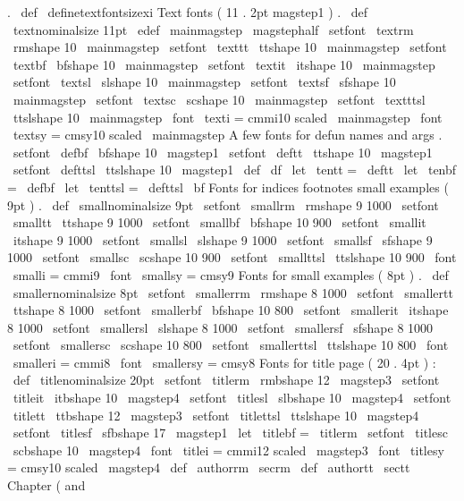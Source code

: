 {.
%
\
def
\
definetextfontsizexi
{
%
Text
fonts
(
11
.
2pt
magstep1
)
.
\
def
\
textnominalsize
{
11pt
}
\
edef
\
mainmagstep
{
\
magstephalf
}
\
setfont
\
textrm
\
rmshape
{
10
}
{
\
mainmagstep
}
\
setfont
\
texttt
\
ttshape
{
10
}
{
\
mainmagstep
}
\
setfont
\
textbf
\
bfshape
{
10
}
{
\
mainmagstep
}
\
setfont
\
textit
\
itshape
{
10
}
{
\
mainmagstep
}
\
setfont
\
textsl
\
slshape
{
10
}
{
\
mainmagstep
}
\
setfont
\
textsf
\
sfshape
{
10
}
{
\
mainmagstep
}
\
setfont
\
textsc
\
scshape
{
10
}
{
\
mainmagstep
}
\
setfont
\
textttsl
\
ttslshape
{
10
}
{
\
mainmagstep
}
\
font
\
texti
=
cmmi10
scaled
\
mainmagstep
\
font
\
textsy
=
cmsy10
scaled
\
mainmagstep
%
A
few
fonts
for
defun
names
and
args
.
\
setfont
\
defbf
\
bfshape
{
10
}
{
\
magstep1
}
\
setfont
\
deftt
\
ttshape
{
10
}
{
\
magstep1
}
\
setfont
\
defttsl
\
ttslshape
{
10
}
{
\
magstep1
}
\
def
\
df
{
\
let
\
tentt
=
\
deftt
\
let
\
tenbf
=
\
defbf
\
let
\
tenttsl
=
\
defttsl
\
bf
}
%
Fonts
for
indices
footnotes
small
examples
(
9pt
)
.
\
def
\
smallnominalsize
{
9pt
}
\
setfont
\
smallrm
\
rmshape
{
9
}
{
1000
}
\
setfont
\
smalltt
\
ttshape
{
9
}
{
1000
}
\
setfont
\
smallbf
\
bfshape
{
10
}
{
900
}
\
setfont
\
smallit
\
itshape
{
9
}
{
1000
}
\
setfont
\
smallsl
\
slshape
{
9
}
{
1000
}
\
setfont
\
smallsf
\
sfshape
{
9
}
{
1000
}
\
setfont
\
smallsc
\
scshape
{
10
}
{
900
}
\
setfont
\
smallttsl
\
ttslshape
{
10
}
{
900
}
\
font
\
smalli
=
cmmi9
\
font
\
smallsy
=
cmsy9
%
Fonts
for
small
examples
(
8pt
)
.
\
def
\
smallernominalsize
{
8pt
}
\
setfont
\
smallerrm
\
rmshape
{
8
}
{
1000
}
\
setfont
\
smallertt
\
ttshape
{
8
}
{
1000
}
\
setfont
\
smallerbf
\
bfshape
{
10
}
{
800
}
\
setfont
\
smallerit
\
itshape
{
8
}
{
1000
}
\
setfont
\
smallersl
\
slshape
{
8
}
{
1000
}
\
setfont
\
smallersf
\
sfshape
{
8
}
{
1000
}
\
setfont
\
smallersc
\
scshape
{
10
}
{
800
}
\
setfont
\
smallerttsl
\
ttslshape
{
10
}
{
800
}
\
font
\
smalleri
=
cmmi8
\
font
\
smallersy
=
cmsy8
%
Fonts
for
title
page
(
20
.
4pt
)
:
\
def
\
titlenominalsize
{
20pt
}
\
setfont
\
titlerm
\
rmbshape
{
12
}
{
\
magstep3
}
\
setfont
\
titleit
\
itbshape
{
10
}
{
\
magstep4
}
\
setfont
\
titlesl
\
slbshape
{
10
}
{
\
magstep4
}
\
setfont
\
titlett
\
ttbshape
{
12
}
{
\
magstep3
}
\
setfont
\
titlettsl
\
ttslshape
{
10
}
{
\
magstep4
}
\
setfont
\
titlesf
\
sfbshape
{
17
}
{
\
magstep1
}
\
let
\
titlebf
=
\
titlerm
\
setfont
\
titlesc
\
scbshape
{
10
}
{
\
magstep4
}
\
font
\
titlei
=
cmmi12
scaled
\
magstep3
\
font
\
titlesy
=
cmsy10
scaled
\
magstep4
\
def
\
authorrm
{
\
secrm
}
\
def
\
authortt
{
\
sectt
}
%
Chapter
(
and
}}
